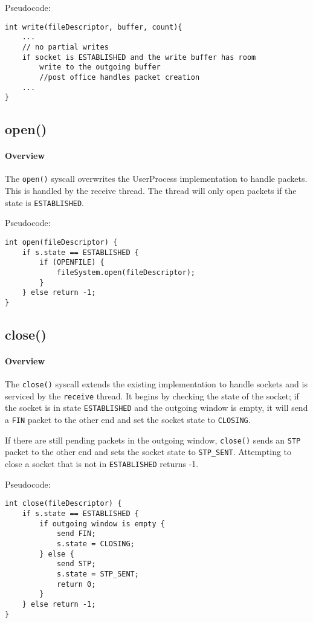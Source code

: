 \documentclass[]{article}
\begin{document}
\noindent Pseudocode: 

\begin{lstlisting}
int write(fileDescriptor, buffer, count){
	...
	// no partial writes
	if socket is ESTABLISHED and the write buffer has room
		write to the outgoing buffer
		//post office handles packet creation
	...
}
\end{lstlisting}
\subsection{open()}
\paragraph{Overview}
The \texttt{open()} syscall overwrites the UserProcess implementation to handle packets. This is handled by the receive thread. The thread will only open packets if the state is \texttt{ESTABLISHED}.

\noindent Pseudocode:

\begin{lstlisting}
int open(fileDescriptor) {
	if s.state == ESTABLISHED {
		if (OPENFILE) {
			fileSystem.open(fileDescriptor);
		} 
	} else return -1;
}
\end{lstlisting}

\subsection{close()}
\paragraph{Overview}
The \texttt{close()} syscall extends the existing implementation to handle sockets and is serviced by the \texttt{receive} thread. It begins by checking the state of the socket; if the socket is in state \texttt{ESTABLISHED} and the outgoing window is empty, it will send a \texttt{FIN} packet to the other end and set the socket state to \texttt{CLOSING}. 

If there are still pending packets in the outgoing window, \texttt{close()} sends an \texttt{STP} packet to the other end and sets the socket state to \texttt{STP\_SENT}. Attempting to close a socket that is not in \texttt{ESTABLISHED} returns -1.


\noindent Pseudocode:

\begin{lstlisting}
int close(fileDescriptor) {
	if s.state == ESTABLISHED {
		if outgoing window is empty {
			send FIN;
			s.state = CLOSING;
		} else {
			send STP;
			s.state = STP_SENT;
			return 0;
		}
	} else return -1;
}
\end{lstlisting}
\end{document}
